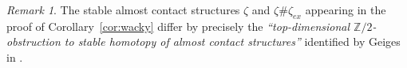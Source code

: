 \documentclass[12pt]{amsart}
\newcommand\Z{\mathbb{Z}}
\newcommand\scxs{\zeta}					%
\newcommand\bscxs{\bar \zeta}			%
\newcommand\im{\textup{Im}}
\newcommand{\an}[1]{\langle{#1}{\rangle}}
\theoremstyle{remark}
\newtheorem{Remark}[Theorem]{Remark}
\newcommand{\jbcomm}[1]{\begingroup\color{green}JB:~#1\endgroup}
\begin{document}
\begin{Remark} \label{rem:Geiges-obstruction}
The stable almost contact structures $\scxs$ and $\scxs \# \scxs_{ex}$ appearing 
in the proof of Corollary~\ref{cor:wacky} differ by precisely the 
{\em ``top-dimensional $\Z/2$-obstruction to stable homotopy of almost contact structures''}
identified by Geiges in \cite[Theorem 4 (2b)]{Geiges97}.  


\end{Remark}
\end{document}
